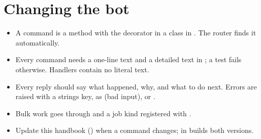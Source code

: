 \section{Changing the bot}

\begin{itemize}
  \item A command is a method with the  decorator
        in a  class in . The router finds it automatically.
  \item Every command needs a one-line  text and a detailed  text in
        ; a test fails otherwise. Handlers contain no literal text.
  \item Every reply should say what happened, why, and what to do next. Errors are raised
        with a strings key, as  (bad input),  or
        .
  \item Bulk work goes through  and a job kind registered with
        .
  \item Update this handbook () when a command changes;
         in  builds both versions.
\end{itemize}
